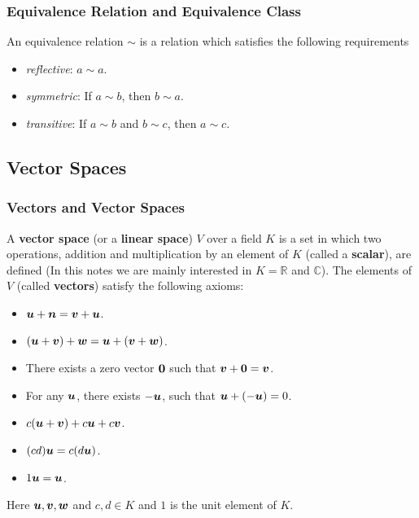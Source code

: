 \documentclass[10pt]{article}
\begin{document}
\subsubsection{Equivalence Relation and Equivalence Class}
\begin{definition}
    An equivalence relation $\sim$ is a relation which satisfies the following requirements
    \begin{itemize}
        \item \textit{reflective}: $a\sim a$.
        \item \textit{symmetric}: If $a\sim b$, then $b\sim a$.
        \item \textit{transitive}: If $a\sim b$ and $b\sim c$, then $a\sim c$.
    \end{itemize}
\end{definition}
\subsection{Vector Spaces}
\subsubsection{Vectors and Vector Spaces}
\begin{definition}
    A \textbf{vector space} (or a \textbf{linear space}) $V$ over a field $K$ is a set in which two operations, addition and multiplication by an element of $K$ (called a \textbf{scalar}),
    are defined (In this notes we are mainly interested in $K=\mathbb{R}$ and $\mathbb{C}$).
    The elements of $V$ (called \textbf{vectors}) satisfy the following axioms:
    \begin{itemize}
        \item $\vb*{u}+\vb*{n}=\vb*{v}+\vb*{u}$.
        \item $(\vb*{u}+\vb*{v})+\vb*{w}=\vb*{u}+(\vb*{v}+\vb*{w})$.
        \item There exists a zero vector $\vb*{0}$ such that $\vb*{v}+\vb*{0}=\vb*{v}$.
        \item For any $\vb*{u}$, there exists $-\vb*{u}$, such that $\vb*{u}+(-\vb*{u})=0$.
        \item $c(\vb*{u}+\vb*{v})+c\vb*{u}+c\vb*{v}$.
        \item $(cd)\vb*{u}=c(d\vb*{u})$.
        \item $1 \vb*{u}=\vb*{u}$.
    \end{itemize}
    Here $\vb*{u}, \vb*{v}, \vb*{w}$ and $c,d\in K$ and $1$ is the unit element of $K$.
\end{definition}
\end{document}
